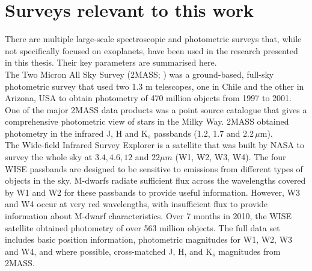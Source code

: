 \section{Surveys relevant to this work}
\label{secSurvey}
There are multiple large-scale spectroscopic and photometric surveys that, while not specifically focused on exoplanets, have been used in the research presented in this thesis. Their key parameters are summarised here.\\

The Two Micron All Sky Survey (2MASS; \citealt{2006Skrutskie}) was a ground-based, full-sky photometric survey that used two 1.3 m telescopes, one in Chile and the other in Arizona, USA to obtain photometry of 470 million objects from 1997 to 2001. One of the major 2MASS data products was a point source catalogue that gives a comprehensive photometric view of stars in the Milky Way. 2MASS obtained photometry in the infrared J, H and K$_s$ passbands (1.2, 1.7 and 2.2\,$\mu$m).\\

The Wide-field Infrared Survey Explorer \citep[WISE;][]{2010Wright} is a satellite that was built by NASA to survey the whole sky at $3.4, 4.6, 12$ and $22 \mu m$ (W1, W2, W3, W4). The four WISE passbands are designed to be sensitive to emissions from different types of objects in the sky. M-dwarfs radiate sufficient flux across the wavelengths covered by W1 and W2 for these passbands to provide useful information. However, W3 and W4 occur at very red wavelengths, with insufficient flux to provide information about M-dwarf characteristics. Over 7 months in 2010, the WISE satellite obtained photometry of over 563 million objects. The full data set includes basic position information, photometric magnitudes for W1, W2, W3 and W4, and where possible, cross-matched J, H, and K$_s$ magnitudes from 2MASS.\\

